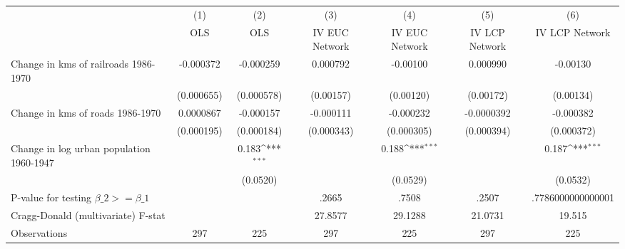 {
\def\sym#1{\ifmmode^{#1}\else\(^{#1}\)\fi}
\begin{tabular}{l*{6}{c}}
\hline\hline
                &\multicolumn{1}{c}{(1)}&\multicolumn{1}{c}{(2)}&\multicolumn{1}{c}{(3)}&\multicolumn{1}{c}{(4)}&\multicolumn{1}{c}{(5)}&\multicolumn{1}{c}{(6)}\\
                &\multicolumn{1}{c}{OLS}&\multicolumn{1}{c}{OLS}&\multicolumn{1}{c}{IV EUC Network}&\multicolumn{1}{c}{IV EUC Network}&\multicolumn{1}{c}{IV LCP Network}&\multicolumn{1}{c}{IV LCP Network}\\
\hline
Change in kms of railroads 1986-1970&-0.000372         &-0.000259         & 0.000792         & -0.00100         & 0.000990         & -0.00130         \\
                &(0.000655)         &(0.000578)         &(0.00157)         &(0.00120)         &(0.00172)         &(0.00134)         \\
[1em]
Change in kms of roads 1986-1970&0.0000867         &-0.000157         &-0.000111         &-0.000232         &-0.0000392         &-0.000382         \\
                &(0.000195)         &(0.000184)         &(0.000343)         &(0.000305)         &(0.000394)         &(0.000372)         \\
[1em]
Change in log urban population 1960-1947&                  &    0.183\sym{***}&                  &    0.188\sym{***}&                  &    0.187\sym{***}\\
                &                  & (0.0520)         &                  & (0.0529)         &                  & (0.0532)         \\
\hline
P-value for testing $\beta\_{2} >= \beta\_{1}$&                  &                  &    .2665         &    .7508         &    .2507         &.7786000000000001         \\
Cragg-Donald (multivariate) F-stat&                  &                  &  27.8577         &  29.1288         &  21.0731         &   19.515         \\
Observations    &      297         &      225         &      297         &      225         &      297         &      225         \\
\hline\hline
\end{tabular}
}
